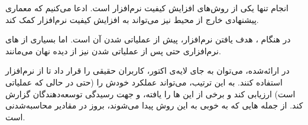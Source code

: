 انجام  تنها یکی از روش‌های افزایش کیفیت نرم‌افزار است. ادعا می‌کنیم که معماری پیشنهادی خارج از محیط  نیز می‌تواند به افزایش کیفیت نرم‌افزار کمک کند.

در هنگام ، هدف یافتن  نرم‌افزار، پیش از عملیاتی شدن آن است. اما بسیاری از ‌های نرم‌افزاری حتی پس از عملیاتی شدن نیز از دیده نهان می‌مانند.

در  ارائه‌شده، می‌توان به جای لایه‌ی اکتور، کاربران حقیقی  را قرار داد تا از نرم‌افزار استفاده کنند. به این ترتیب،  می‌تواند عملکرد خودش را (حتی در حالی که عملیاتی است) ارزیابی کند و برخی از این ‌ها را یافته، و جهت رسیدگی توسعه‌دهندگان گزارش کند. از جمله ‌هایی که به خوبی به این روش پیدا می‌شوند، بروز  در مقادیر محاسبه‌شدنی است.
